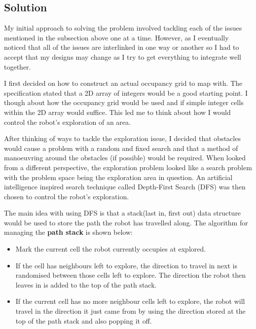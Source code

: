 \documentclass[a4paper,12pt]{article}
\begin{document}
\subsection{Solution}
\noindent My initial approach to solving the problem involved tackling each of the issues mentioned in the subsection above one at a time. However, as I eventually noticed that all of the issues are interlinked in one way or another so I had to accept that my designs may change as I try to get everything to integrate well together.

\vspace{5mm}
\noindent I first decided on how to construct an actual occupancy grid to map with. The specification stated that a 2D array of integers would be a good starting point. I though about how the occupancy grid would be used and if simple integer cells within the 2D array would suffice. This led me to think about how I would control the robot's exploration of an area.

\vspace{5mm}
\noindent After thinking of ways to tackle the exploration issue, I decided that obstacles would cause a problem with a random and fixed search and that a method of manoeuvring around the obstacles (if possible) would be required. When looked from a different perspective, the exploration problem looked like a search problem with the problem space being the exploration area in question. An artificial intelligence inspired search technique called Depth-First Search (DFS) was then chosen to control the robot's exploration.

\vspace{5mm}
\noindent The main idea with using DFS is that a stack(last in, first out) data structure would be used to store the path the robot has travelled along. The algorithm for managing the \textbf{path stack} is shown below:

\begin{itemize}
	\item Mark the current cell the robot currently occupies at explored.
	\item If the cell has neighbours left to explore, the direction to travel in next is randomised between those cells left to explore. The direction the robot then leaves in is added to the top of the path stack.
	\item If the current cell has no more neighbour cells left to explore, the robot will travel in the direction it just came from by using the direction stored at the top of the path stack and also popping it off.
\end{itemize}
\end{document}

